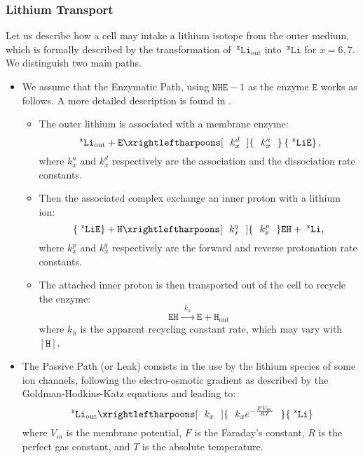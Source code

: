 \documentclass[aps,onecolumn,10pt]{revtex4}
\newcommand{\mychem}[1]{\mathtt{#1}}
\newcommand{\myconc}[1]{\left\lbrack{#1}\right\rbrack}
\newcommand{\spLi}[1]{{~^{\mychem{#1}}\mychem{Li}}}
\newcommand{\spEout}{\mychem{E}}
\newcommand{\spLiE}[1]{\left\lbrace\spLi{#1}\spEout\right\rbrace}
\newcommand{\spLiOut}[1]{{\spLi{#1}}_{\mathrm{out}}}
\newcommand{\spEHin}{\mychem{EH}}
\newcommand{\spproton}{\mychem{H}}
\newcommand{\proton}{\myconc{\spproton}}
\newcommand{\NHE}[1]{\mychem{NHE}{\!-\!#1}}
\newcommand{\todo}[1]{\framebox{\textbf{\color{WildStrawberry}{#1}}}}
\begin{document}
\subsubsection{Lithium Transport}

Let us describe how a cell may intake a lithium isotope from the outer medium, which is formally described by the transformation
of $\spLiOut{x}$ into $\spLi{x}$ for $x=6,7$. We distinguish two main paths.

\begin{itemize}
\item We assume that the Enzymatic Path, using $\NHE{1}$ as the enzyme $\spEout$ works as follows. A more detailed description is found in \todo{ref}.
	\begin{itemize}
	\item The outer lithium is associated with a membrane enzyme:
	\begin{equation}
		\label{eq:pre}
		\spLiOut{x} + \spEout  \xrightleftharpoons[~~k^d_x~~]{~~k^a_x~~} \spLiE{x},
	\end{equation}
	where $k^a_x$ and $k^d_x$ respectively are the association and the dissociation rate constants.
	
	\item Then the associated complex exchange an inner proton with a lithium ion:
	\begin{equation}
		\label{eq:xch}
		\spLiE{x} + \spproton   \xrightleftharpoons[~~k^q_x~~]{~~k^p_x~~}   \spEHin + \spLi{x}, 
	\end{equation}
	where $k^p_x$ and $k^q_x$ respectively are the forward and reverse protonation rate constants.
	
	\item The attached inner proton is then transported out of the cell to recycle the enzyme:
	\begin{equation}
			\spEHin   \xrightarrow{~~k_h~~}   \spEout + \spproton_{\mathrm{out}} 
	\end{equation}	
	where $k_h$ is the apparent recycling constant rate, which may vary with $\proton$.
	\end{itemize}

\item The Passive Path (or Leak) consists in the use by the lithium species of some ion channels, following the electro-osmotic gradient as described by the Goldman-Hodkins-Katz \todo{ref} equations and leading to:
	\begin{equation}
	\label{eq:ghk}
		\spLiOut{x} \xrightleftharpoons[~~k_x~~]{~~k_x e^{-\frac{FV_m}{RT}}~~}   \spLi{x} 
	\end{equation}
where $V_m$ is the membrane potential, $F$ is the Faraday's constant, $R$ is the perfect gas constant, and $T$ is the absolute temperature.

\end{itemize}
\end{document}
